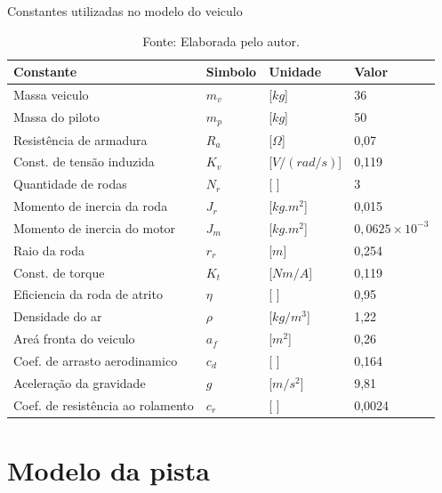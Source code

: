 \begin{table}[H]
	\centering
	\caption{Constantes utilizadas no modelo do veiculo}
	\begin{tabular}{llll}
		\toprule
		\textbf{Constante} & \textbf{Simbolo} & \textbf{Unidade} & \textbf{Valor}\\
		\hline
		Massa veiculo                       & $m_v$  & [$kg$]              & 36      \\
        Massa do piloto                     & $m_p$  & [$kg$]              & 50      \\
        Resistência de armadura             & $R_a$  & [$\Omega$]        & 0,07    \\  
        Const. de tensão induzida           & $K_v$  & [$V/(rad/s)$]       & 0,119   \\
        Quantidade de rodas                 & $N_r$  & [ ]                & 3       \\
        Momento de inercia da roda          & $J_r$  & [$kg.m^2$]        & 0,015   \\
        Momento de inercia do motor         & $J_m$  & [$kg.m^2$]        & $0,0625 \times 10^{-3}$\\
        Raio da roda                        & $r_r$  & [$m$]               & 0,254   \\
        Const. de torque                    & $K_t$  & [$Nm/A$]            & 0,119   \\
        Eficiencia da roda de atrito        & $\eta$ & [ ]                & 0,95    \\
        Densidade do ar                     & $\rho$ & [$kg/m^3$]        & 1,22    \\
        Areá fronta do veiculo              & $a_f$  & [$m^2$]           & 0,26    \\
        Coef. de arrasto aerodinamico       & $c_d$  & [ ]                & 0,164   \\
        Aceleração da gravidade             & $g$    & [$m/s^2$]         & 9,81    \\
        Coef. de resistência ao rolamento   & $c_r$  & [ ]                & 0,0024  \\
		\bottomrule
	\end{tabular}
	\caption*{\footnotesize Fonte: Elaborada pelo autor.}
	\label{tab:constantes}
\end{table}


\section{Modelo da pista}


